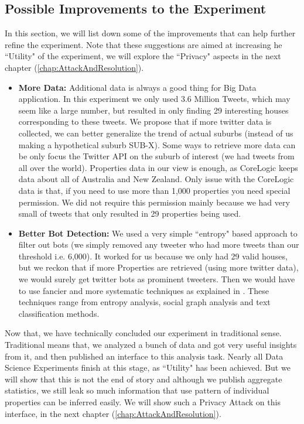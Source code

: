 \documentclass[12pt]{report}
\theoremstyle{named}
\begin{document}
\subsection{Possible Improvements to the Experiment}
\label{sec:ImprovementsToExperiemnt}
In this section, we will list down some of the improvements that can help further refine the experiment. Note that these suggestions are aimed at increasing he ``Utility" of the experiment, we will explore the ``Privacy" aspects in the next chapter (\ref{chap:AttackAndResolution}).
\begin{itemize}
  \item \textbf{More Data:} Additional data is always a good thing for Big Data application. In this experiment we only used 3.6 Million Tweets, which may seem like a large number, but resulted in only finding 29 interesting houses corresponding to these tweets. We propose that if more twitter data is collected, we can better generalize the trend of actual suburbs (instead of us making a hypothetical suburb SUB-X). Some ways to retrieve more data can be only focus the Twitter API on the suburb of interest (we had tweets from all over the world). Properties data in our view is enough, as CoreLogic keeps data about all of Australia and New Zealand. Only issue with the CoreLogic data is that, if you need to use more than 1,000 properties you need special permission. We did not require this permission mainly because we had very small of tweets that only resulted in 29 properties being used.
  
  \item \textbf{Better Bot Detection:} We used a very simple ``entropy" based approach to filter out bots (we simply removed any tweeter who had more tweets than our threshold i.e. 6,000). It worked for us because we only had 29 valid houses, but we reckon that if more Properties are retrieved (using more twitter data), we would surely get twitter bots as prominent tweeters. Then we would have to use fancier and more systematic techniques as explained in \cite{chu2010tweeting}. These techniques range from entropy analysis, social graph analysis and text classification methods.

\end{itemize}


Now that, we have technically concluded our experiment in traditional sense. Traditional means that, we analyzed a bunch of data and got very useful insights from it, and then published an interface to this analysis task. Nearly all Data Science Experiments finish at this stage, as ``Utility" has been achieved. But we will show that this is not the end of story and although we publish aggregate statistics, we still leak so much information that use pattern of individual properties can be inferred easily. We will show such a Privacy Attack on this interface, in the next chapter (\ref{chap:AttackAndResolution}).
\end{document}
